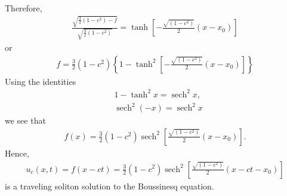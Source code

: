 \documentclass[12pt,reqno]{amsart}
\numberwithin{equation}{section}  %
\def\sech{\operatorname{sech}}
\begin{document}
%
%
Therefore,
%
%
\begin{equation*}
\begin{split}
  \frac{\sqrt{\frac{3}{2}(1-c^{2}) - f}}{\sqrt{\frac{3}{2}(1-c^{2})}} =
  \tanh \left [- \frac{\sqrt{(1-c^{2})}}{2}(x -x_{0}) \right ] 
\end{split}
\end{equation*}
%
%
or
%
%
%
\begin{equation*}
\begin{split}
  f = \frac{3}{2}(1-c^{2}) \left \{ 1 - \tanh^{2} \left [- \frac{\sqrt{(1-c^{2})}}{2}(x -x_{0})
  \right ] \right \}
  \end{split}
\end{equation*}
%
%
Using the identities
%
%
\begin{equation*}
\begin{split}
  & 1 - \tanh^{2}x = \sech^{2}x,
  \\
  & \sech^{2}(-x) = \sech^{2}x
\end{split}
\end{equation*}
%
we see that
%
%
\begin{equation*}
\begin{split}
  f(x) = \frac{3}{2}(1-c^{2}) \sech^{2} \left [\frac{\sqrt{(1-c^{2})}}{2}(x -x_{0})
  \right ]. 
  \end{split}
\end{equation*}
%
%
Hence, %
%
\begin{equation*}
\begin{split}
  u_{c}(x,t) = f(x - ct) = \frac{3}{2}(1-c^{2}) \sech^{2} \left
  [\frac{\sqrt{(1-c^{2})}}{2}(x -ct -x_{0})
  \right ]
\end{split}
\end{equation*}
%
%
is a traveling soliton solution to the Boussinesq equation.
%

%
%
%
%
%
%
\end{document}
